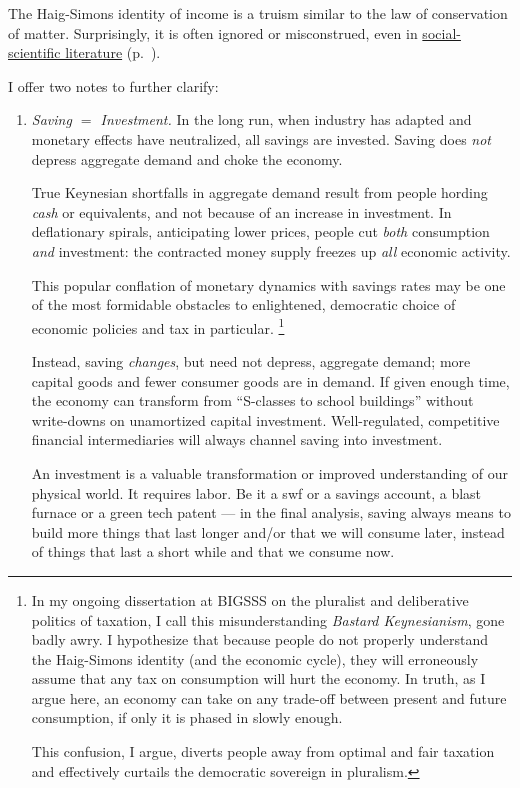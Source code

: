 The Haig-Simons identity of income is a truism similar to the law of conservation of matter.
Surprisingly, it is often ignored or misconstrued, even in \hyperref[sec:Literature]{social-scientific literature} (p.~\pageref{sec:Literature}).

I offer two notes to further clarify:
\begin{enumerate}
	\item \emph{Saving $=$ Investment.}
	In the long run, when industry has adapted and monetary effects have neutralized, all savings are invested.
	Saving does \emph{not} depress aggregate demand and choke the economy.

	True Keynesian shortfalls in aggregate demand result from people hording \emph{cash} or equivalents, and not because of an increase in investment.
	In deflationary spirals, anticipating lower prices, people cut \emph{both} consumption \emph{and} investment:
	the contracted money supply freezes up \emph{all} economic activity.

	This popular conflation of monetary dynamics with savings rates may be one of the most formidable obstacles to enlightened, democratic choice of economic policies and tax in particular.
	\footnote{
		In my ongoing dissertation at \gls{BIGSSS} on the pluralist and deliberative politics of taxation, I call this misunderstanding \emph{Bastard Keynesianism}, gone badly awry.
		I hypothesize that because people do not properly understand the Haig-Simons identity (and the economic cycle), they will erroneously assume that any tax on consumption will hurt the economy.
		In truth, as I argue here, an economy can take on any trade-off between present and future consumption, if only it is phased in slowly enough.

		This confusion, I argue, diverts people away from optimal and fair taxation and effectively curtails the democratic sovereign in pluralism.
	}

	Instead, saving \emph{changes}, but need not depress, aggregate demand;
	more capital goods and fewer consumer goods are in demand.
	If given enough time, the economy can transform from ``S-classes to school buildings'' without write-downs on unamortized capital investment.
	Well-regulated, competitive financial intermediaries will always channel saving into investment.

	An investment is a valuable transformation or improved understanding of our physical world.
	It requires labor.
	Be it a \gls{swf} or a savings account, a blast furnace or a green tech patent --- in the final analysis, saving always means to build more things that last longer and/or that we will consume later, instead of things that last a short while and that we consume now.


\end{enumerate}
